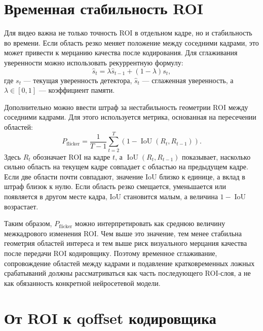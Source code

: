 \documentclass[12pt,a4paper,oneside,openany]{report}
\begin{document}

\section{Временная стабильность ROI}

Для видео важна не только точность ROI в отдельном кадре, но и стабильность во времени. Если
область резко меняет положение между соседними кадрами, это может привести к мерцанию качества
после кодирования. Для сглаживания уверенности можно использовать рекуррентную формулу:
\begin{equation}
  \hat{s}_{t} =\lambda \hat{s}_{t-1}+(1-\lambda)s_t,
  \label{eq:smoothing}
\end{equation}
где $s_t$ --- текущая уверенность детектора, $\hat{s}_t$ --- сглаженная уверенность, а $\lambda
\in [0,1]$ --- коэффициент памяти.

Дополнительно можно ввести штраф за нестабильность геометрии ROI между соседними кадрами. Для
этого используется метрика, основанная на пересечении областей:
\begin{equation}
  P_{\mathrm{flicker}} = \frac{1}{T-1} \sum_{t=2}^{T} \left(1 - \operatorname{IoU}(R_t,
  R_{t-1})\right).
  \label{eq:flicker}
\end{equation}
Здесь $R_t$ обозначает ROI на кадре $t$, а $\operatorname{IoU}(R_t, R_{t-1})$ показывает,
насколько сильно область на текущем кадре совпадает с областью на предыдущем кадре. Если две
области почти совпадают, значение IoU близко к единице, а вклад в штраф близок к нулю. Если
область резко смещается, уменьшается или появляется в другом месте кадра, IoU становится малым,
а величина $1-\operatorname{IoU}$ возрастает.

Таким образом, $P_{\mathrm{flicker}}$ можно интерпретировать как среднюю величину межкадрового
изменения ROI. Чем выше это значение, тем менее стабильна геометрия областей интереса и тем выше
риск визуального мерцания качества после передачи ROI кодировщику. Поэтому временное
сглаживание, сопровождение областей между кадрами и подавление кратковременных ложных
срабатываний должны рассматриваться как часть последующего ROI-слоя, а не как обязанность
конкретной нейросетевой модели.


\section{От ROI к qoffset кодировщика}
\end{document}
